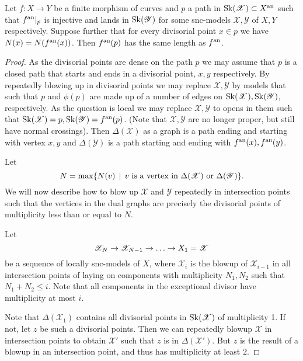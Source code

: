 \begin{lemma}\label{lem:equality_lenghts_preserve_mult}
	Let $f: X \to Y$ be a finite morphism of curves and $p$ a path in $\operatorname{Sk}(\mathscr X)\subset X{}^{\text{an}} $  such that $f{}^{\text{an}}|_p$ is injective and lands in $\operatorname{Sk}(\mathscr Y)$ for some snc-models $\mathscr X, \mathscr Y$ of $X, Y$ respectively. 
	Suppose further that for every divisorial point $x \in p$  we have $N(x) = N(f{}^{\text{an}}(x))$. 
	Then $f{}^{\text{an}}(p)$ has the same length as $f{}^{\text{an}}$. 
\end{lemma}
\begin{proof}
	As the divisorial points are dense on the path $p$ we may assume that $p$ is a closed path that starts and ends in a divisorial point, $x, y$ respectively.
	By repeatedly blowing up in divisorial points we may replace $\mathscr X, \mathscr Y$ by models that such that $p$ and $\phi(p)$ are made up of a number of edges on $\operatorname{Sk}(\mathscr X), \operatorname{Sk}(\mathscr Y)$, respectively. 
	As the question is local we may replace $\mathscr X, \mathscr Y$ to opens in them such that $\operatorname{Sk}(\mathscr X) = p, \operatorname{Sk}(\mathscr Y) = f{}^{\text{an}} (p)$. (Note that $\mathscr X, \mathscr Y$ are no longer proper, but still have normal crossings).  
	Then $\Delta(\mathscr X)$ as a graph is a path ending and starting with vertex $x, y$ and $\Delta(\mathscr Y)$ is a path starting and ending with $f{}^{\text{an}}(x), f{}^{\text{an}}(y)$. 

	Let \[
		N = \max \{N(v) \st v \text{ is a vertex in } \Delta(\mathscr X) \text{ or } \Delta(\mathscr Y)\} 
	.\] 
	We will now describe how to blow up $\mathscr X$ and $\mathscr Y$ repeatedly in intersection points such that the vertices in the dual graphs are precisely the divisorial points of multiplicity less than or equal to $N$. 

	Let \[
	\mathscr X_N \to \mathscr X_{N - 1} \to \ldots \to \mathscr \mathscr X_1 = \mathscr X
	\] 
	be a sequence of locally snc-models of  $X$, where $\mathscr X_i$ is the blowup of $\mathscr X_{i-1}$ in all intersection points of laying on components with multiplicity $N_1, N_2$ such that $N_1 + N_2 \le i$. 
	Note that all components in the exceptional divisor have multiplicity at most $i$. 

	Note that $\Delta(\mathscr X_1)$ contains all divisorial points in $\operatorname{Sk}(\mathscr X)$ of multiplicity 1. If not, let $z$ be such a divisorial points. 
	Then we can repeatedly blowup $\mathscr X$ in intersection points to obtain $\mathscr X'$ such that $z$ is in $\Delta(\mathscr X')$. 
	But $z$ is the result of a blowup in an intersection point, and thus has multiplicity at least $2$. 


\end{proof}
